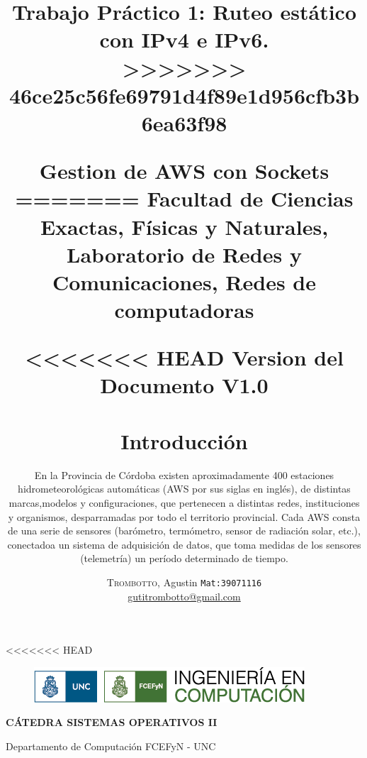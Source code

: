 \documentclass[10pt, a4paper,notitlepage]{article}
\newcommand{\HRule}{\rule{\linewidth}{0.5mm}} %
\begin{document}
<<<<<<< HEAD
 \begin{figure}[H] 
 	\centering
 	\includegraphics[scale=0.9]{./imagenes/logo_facu.png}
\end{figure}
{\center
	\huge
	\textbf{CÁTEDRA SISTEMAS OPERATIVOS II\\}}

{\center
	\Large{Departamento de Computación	FCEFyN - UNC\\}}

\title{%
		{ \bfseries{ Gestion de AWS con Sockets}}\\[0.4cm]
=======
{\center \large \textsf{Facultad de Ciencias Exactas, Físicas y Naturales, Laboratorio de Redes y
Comunicaciones, Redes de computadoras\\}}
\title{%
		{ \bfseries{Trabajo Práctico 1: Ruteo estático con IPv4 e IPv6.}}\\[0.4cm]
>>>>>>> 46ce25c56fe69791d4f89e1d956cfb3b6ea63f98
		} %
\author{
\textsc{Trombotto}, Agustin  {\small \texttt{Mat:39071116}}\\
\href{mailto:gutitrombotto@gmail.com}{gutitrombotto@gmail.com}\\
}

{\let\newpage\relax\maketitle}


<<<<<<< HEAD
{\center
\textbf{Version del Documento} V1.0\\}
\clearpage

\section{Introducción}
En la Provincia de Córdoba existen aproximadamente 400 estaciones hidrometeorológicas automáticas (AWS por sus siglas en inglés), de distintas marcas,modelos y configuraciones, que pertenecen a distintas redes, instituciones y organismos, desparramadas por todo el territorio provincial. Cada AWS consta de una
serie de sensores (barómetro, termómetro, sensor de radiación solar, etc.), conectadoa un sistema de adquisición de datos, que toma medidas de los sensores (telemetría) un período determinado de tiempo.

}
\end{document}
